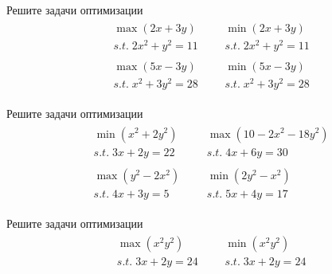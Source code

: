 
\begin{exercise}
Решите задачи оптимизации
\begin{align*}
	&\begin{gathered}
		\max(2x+3y) \\ s.t.\; 2x^2+y^2=11 
	\end{gathered} &
	&\begin{gathered}
		\min(2x+3y) \\ s.t.\; 2x^2+y^2=11 
	\end{gathered} \\
	&\begin{gathered}
		\max(5x-3y) \\ s.t.\; x^2+3y^2=28 
	\end{gathered} &
	&\begin{gathered}
		\min(5x-3y) \\ s.t.\; x^2+3y^2=28 
	\end{gathered}
\end{align*}
\end{exercise}

\begin{exercise}
Решите задачи оптимизации
\begin{align*}
	& \begin{gathered}
		\min(x^2+2y^2) \\ s.t.\;3x+2y=22
	\end{gathered} &
	& \begin{gathered}
		\max(10-2x^2-18y^2) \\ s.t.\;4x+6y=30
	\end{gathered} \\
	& \begin{gathered}
		\max(y^2-2x^2) \\ s.t.\;4x+3y=5
	\end{gathered} &
	& \begin{gathered}
		\min(2y^2-x^2) \\ s.t.\;5x+4y=17
	\end{gathered}
\end{align*}
\end{exercise}

\begin{exercise}
Решите задачи оптимизации
\begin{align*}
	& \begin{gathered}
		\max(x^2y^2) \\ s.t.\;3x+2y=24
	\end{gathered} &
	& \begin{gathered}
		\min(x^2y^2) \\ s.t.\;3x+2y=24
	\end{gathered}
\end{align*}
\end{exercise}

